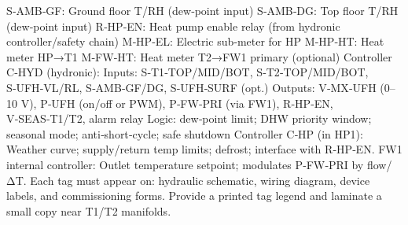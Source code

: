 \markdownRendererUlEndTight \markdownRendererInterblockSeparator
{}
\markdownRendererSectionEnd \markdownRendererSectionBegin
{}\markdownRendererInterblockSeparator
{}\markdownRendererUlBeginTight
\markdownRendererUlItem S‑AMB‑GF: Ground floor T/RH (dew‑point input)\markdownRendererUlItemEnd 
\markdownRendererUlItem S‑AMB‑DG: Top floor T/RH (dew‑point input)\markdownRendererUlItemEnd 
\markdownRendererUlEndTight \markdownRendererInterblockSeparator
{}
\markdownRendererSectionEnd \markdownRendererSectionBegin
{}\markdownRendererInterblockSeparator
{}\markdownRendererUlBeginTight
\markdownRendererUlItem R‑HP‑EN: Heat pump enable relay (from hydronic controller/safety chain)\markdownRendererUlItemEnd 
\markdownRendererUlItem M‑HP‑EL: Electric sub‑meter for HP\markdownRendererUlItemEnd 
\markdownRendererUlItem M‑HP‑HT: Heat meter HP→T1\markdownRendererUlItemEnd 
\markdownRendererUlItem M‑FW‑HT: Heat meter T2→FW1 primary (optional)\markdownRendererUlItemEnd 
\markdownRendererUlEndTight \markdownRendererInterblockSeparator
{}
\markdownRendererSectionEnd \markdownRendererSectionBegin
{}\markdownRendererInterblockSeparator
{}\markdownRendererUlBeginTight
\markdownRendererUlItem Controller C‑HYD (hydronic):\markdownRendererUlItemEnd 
\markdownRendererUlItem Inputs: S‑T1‑TOP/MID/BOT, S‑T2‑TOP/MID/BOT, S‑UFH‑VL/RL, S‑AMB‑GF/DG, S‑UFH‑SURF (opt.)\markdownRendererUlItemEnd 
\markdownRendererUlItem Outputs: V‑MX‑UFH (0–10 V), P‑UFH (on/off or PWM), P‑FW‑PRI (via FW1), R‑HP‑EN, V‑SEAS‑T1/T2, alarm relay\markdownRendererUlItemEnd 
\markdownRendererUlItem Logic: dew‑point limit; DHW priority window; seasonal mode; anti‑short‑cycle; safe shutdown\markdownRendererUlItemEnd 
\markdownRendererUlItem Controller C‑HP (in HP1):\markdownRendererUlItemEnd 
\markdownRendererUlItem Weather curve; supply/return temp limits; defrost; interface with R‑HP‑EN.\markdownRendererUlItemEnd 
\markdownRendererUlItem FW1 internal controller:\markdownRendererUlItemEnd 
\markdownRendererUlItem Outlet temperature setpoint; modulates P‑FW‑PRI by flow/ΔT.\markdownRendererUlItemEnd 
\markdownRendererUlEndTight \markdownRendererInterblockSeparator
{}
\markdownRendererSectionEnd \markdownRendererSectionBegin
{}\markdownRendererInterblockSeparator
{}\markdownRendererUlBeginTight
\markdownRendererUlItem Each tag must appear on: hydraulic schematic, wiring diagram, device labels, and commissioning forms.\markdownRendererUlItemEnd 
\markdownRendererUlItem Provide a printed tag legend and laminate a small copy near T1/T2 manifolds.\markdownRendererUlItemEnd 
\markdownRendererUlEndTight 
\markdownRendererSectionEnd 
\markdownRendererSectionEnd \markdownRendererDocumentEnd